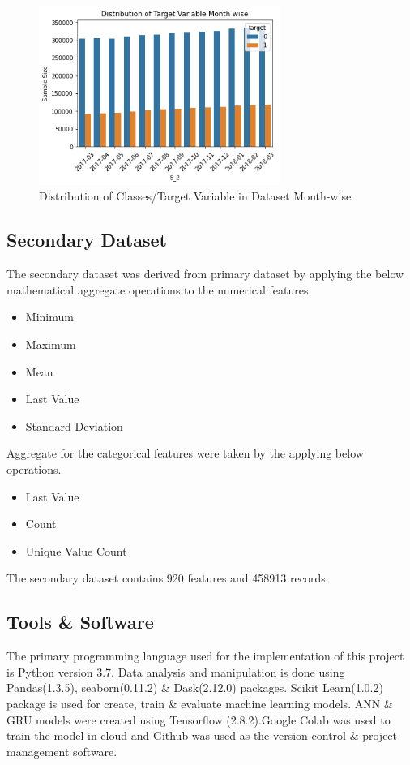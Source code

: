 \documentclass[twoside,11pt,a4paper]{article}
\begin{document}
\begin{figure}[ht]
	\centering
	\includegraphics[width=0.7\textwidth]{dist_class_monthwise}
	\caption[Distribution of Classes/Target Variable in Dataset Month-wise]{Distribution of Classes/Target Variable in Dataset Month-wise}
	\label{fig:dist_class_monthwise}
\end{figure}
\FloatBarrier
\subsection{Secondary Dataset}
The secondary dataset was derived from primary dataset by applying the below mathematical aggregate operations to the numerical features.
\begin{itemize}
	\item Minimum 
	\item Maximum
	\item Mean
	\item Last Value
	\item Standard Deviation
\end{itemize}

Aggregate for the categorical features were taken by the applying below operations.
\begin{itemize}
	\item Last Value
	\item Count
	\item Unique Value Count
\end{itemize}

The secondary dataset contains 920 features and 458913 records.

\subsection{Tools \& Software}
The primary programming language used for the implementation of this project is Python version 3.7. Data analysis and manipulation is done using Pandas(1.3.5), seaborn(0.11.2) \& Dask(2.12.0) packages. Scikit Learn(1.0.2) package is used for create, train \& evaluate machine learning models. \acs{ANN} \& \acs{GRU} models were created using Tensorflow (2.8.2).Google Colab was used to train the model in cloud and Github was used as the version control \& project management software.
\end{document}
